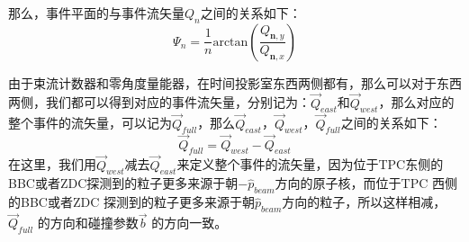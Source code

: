 那么，事件平面的与事件流矢量$Q_{n}$之间的关系如下：
\begin{equation}
\label{eq:EventPlane}
\Psi_{n} = \frac{1}{n} \mathrm{arctan}(\frac{Q_{\textbf{n},y}}{Q_{\textbf{n},x}})
\end{equation}

由于束流计数器和零角度量能器，在时间投影室东西两侧都有，那么可以对于东西两侧，我们都可以得到对应的事件流矢量，分别记为：$\vec{Q}_{east}$和$\vec{Q}_{west}$，那么对应的整个事件的流矢量，可以记为$\vec{Q}_{full}$，那么$\vec{Q}_{east}$，$\vec{Q}_{west}$，$\vec{Q}_{full}$之间的关系如下：
\begin{equation}
\label{eq:full_east_west}
\vec{Q}_{full} = \vec{Q}_{west} - \vec{Q}_{east}
\end{equation}
在这里，我们用$\vec{Q}_{west}$减去$\vec{Q}_{east}$来定义整个事件的流矢量，因为位于TPC东侧的BBC或者ZDC探测到的粒子更多来源于朝$-\hat{p}_{beam}$方向的原子核，而位于TPC 西侧的BBC或者ZDC 探测到的粒子更多来源于朝$\hat{p}_{beam}$方向的粒子，所以这样相减，$\vec{Q}_{full}$ 的方向和碰撞参数$\vec{b}$ 的方向一致。

